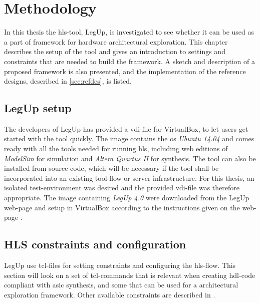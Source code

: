 \chapter{Methodology}
\label{chp:methodology} 
In this thesis the \gls{hls}-tool, LegUp, is investigated to see whether it can be used as a part of framework for hardware architectural exploration. This chapter describes the setup of the tool and gives an introduction to settings and constraints that are needed to build the framework. A sketch and description of a proposed framework is also presented, and the implementation of the reference designs, described in \cref{sec:refdes}, is listed.
\section{LegUp setup}
The developers of LegUp has provided a \gls{vdi}-file for VirtualBox, to let users get started with the tool quickly. The image contains the \gls{os} \textit{Ubuntu 14.04} and comes ready with all the tools needed for running \gls{hls}, including web editions of \textit{ModelSim} for simulation and \textit{Altera Quartus II} for synthesis. The tool can also be installed from source-code, which will be necessary if the tool shall be incorporated into an existing tool-flow or server infrastructure.
For this thesis, an isolated test-environment was desired and the provided \gls{vdi}-file was therefore appropriate. The image containing \textit{LegUp 4.0} were downloaded from the LegUp web-page and setup in VirtualBox according to the instructions given on the web-page \cite{legupgetstarted}. 

\section{HLS constraints and configuration}
LegUp use \gls{tcl}-files for setting constraints and configuring the \gls{hls}-flow. This section will look on a set of \gls{tcl}-commands that is relevant when creating \gls{hdl}-code compliant with \gls{asic} synthesis, and some that can be used for a architectural exploration framework. Other available constraints are described in \cite{legupconst}.
